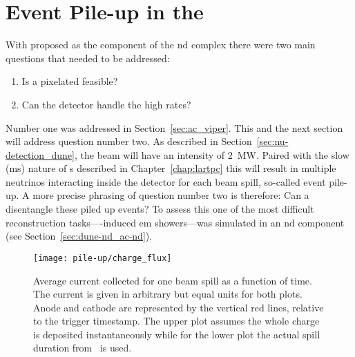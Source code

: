 \section{Event Pile-up in the }
\label{sec:dune-nd_pile-up}

With \AC{} proposed as  the \lar{} component of the \dune{} \gls{nd} complex there were two main questions that needed to be addressed:
\begin{enumerate}
	\item Is a pixelated \lartpc{} feasible?
	\item Can the \lar{} detector handle the high rates?
\end{enumerate}
Number one was addressed in Section~\ref{sec:ac_viper}.
This and the next section will address question number two.
As described in Section~\ref{sec:nu-detection_dune}, the \dune{} beam will have an intensity of \SI{2}{\mega\watt}.
Paired with the slow (\si{\milli\second}) nature of \lartpc{}s described in Chapter~\ref{chap:lartpc} this will result in multiple neutrinos interacting inside the detector for each beam spill, so-called event pile-up.
A more precise phrasing of question number two is therefore: Can a \lartpc{} disentangle these piled up events?
To assess this one of the most difficult reconstruction tasks---\Pgpz-induced \gls{em} showers---was simulated in an \AC{} \gls{nd} component (see Section~\ref{sec:dune-nd_ac-nd}).

\begin{figure}[htb]
	\centering
	\texttt{[image: pile-up/charge\_flux]}
	\caption[Average current collected for one beam spill as a function of time]{%
		Average current collected for one beam spill as a function of time.
		The current is given in arbitrary but equal units for both plots.
		Anode and cathode are represented by the vertical red lines, relative to the trigger timestamp.
		The upper plot assumes the whole charge is deposited instantaneously while for the lower plot the actual spill duration from~\cite{dune2} is used.
	}
	\label{fig:dune-nd_charge-flux}
\end{figure}

